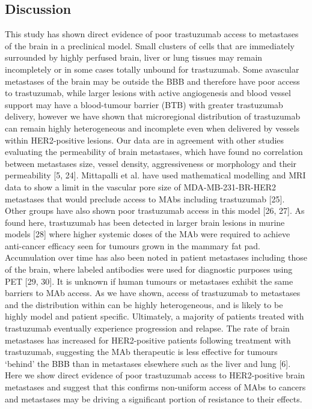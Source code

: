 \subsection{Discussion}

This study has shown direct evidence of poor trastuzumab access to metastases of the brain in a preclinical model.
Small clusters of cells that are immediately surrounded by highly perfused brain, liver or lung tissues may remain incompletely or in some cases totally unbound for trastuzumab.
Some avascular metastases of the brain may be outside the BBB and therefore have poor access to trastuzumab, while larger lesions with active angiogenesis and blood vessel support may have a blood-tumour barrier (BTB) with greater trastuzumab delivery, however we have shown that microregional distribution of trastuzumab can remain highly heterogeneous and incomplete even when delivered by vessels within HER2-positive lesions.
Our data are in agreement with other studies evaluating the permeability of brain metastases, which have found no correlation between metastases size, vessel density, aggressiveness or morphology and their permeability [5, 24].
Mittapalli et al. have used mathematical modelling and MRI data to show a limit in the vascular pore size of MDA-MB-231-BR-HER2 metastases that would preclude access to \ac{MAbs} including trastuzumab [25].
Other groups have also shown poor trastuzumab access in this model [26, 27].
As found here, trastuzumab has been detected in larger brain lesions in murine models [28] where higher systemic doses of the \ac{MAb} were required to achieve anti-cancer efficacy seen for tumours grown in the mammary fat pad.
Accumulation over time has also been noted in patient metastases including those of the brain, where labeled antibodies were used for diagnostic purposes using PET [29, 30].
It is unknown if human tumours or metastases exhibit the same barriers to \ac{MAb} access.
As we have shown, access of trastuzumab to metastases and the distribution within can be highly heterogeneous, and is likely to be highly model and patient specific.
Ultimately, a majority of patients treated with trastuzumab eventually experience progression and relapse.
The rate of brain metastases has increased for HER2-positive patients following treatment with trastuzumab, suggesting the \ac{MAb} therapeutic is less effective for tumours `behind' the BBB than in metastases elsewhere such as the liver and lung [6].
Here we show direct evidence of poor trastuzumab access to HER2-positive brain metastases and suggest that this confirms non-uniform access of \ac{MAbs} to cancers and metastases may be driving a significant portion of resistance to their effects.

